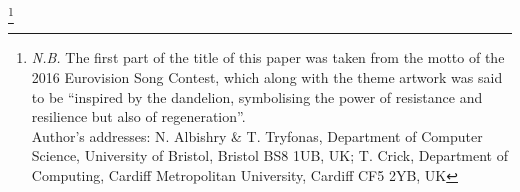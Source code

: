 \documentclass[sigconf]{acmart}
\begin{document}
%
%




\thanks{{\emph{N.B.}} The first part of the title of this paper was
taken from the motto of the 2016 Eurovision Song Contest, which along
with the theme artwork was said to be ``inspired by the dandelion,
symbolising the power of resistance and resilience but also of
regeneration''.\\

Author's addresses: N. Albishry \& T. Tryfonas, Department of
Computer Science, University of Bristol, Bristol BS8 1UB, UK;
T. Crick, Department of Computing, Cardiff Metropolitan University,
Cardiff CF5 2YB, UK}


\maketitle




 
\end{document}
